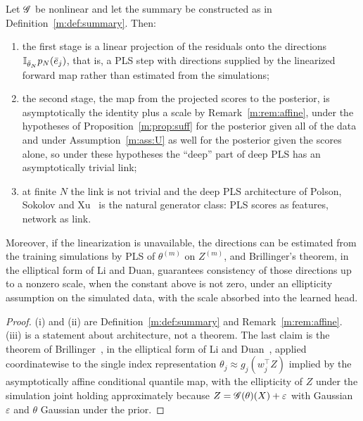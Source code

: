 \begin{proposition}\label{m:prop:dpls}
Let $\mathscr{G}$ be nonlinear and let the summary be constructed as in Definition~\ref{m:def:summary}. Then:
\begin{enumerate}[label=(\roman*),nosep]
\item the first stage is a linear projection of the residuals onto the directions $\mathbb{I}_{\bar\theta_N}p_N(\bar e_j)$, that is, a PLS step with directions supplied by the linearized forward map rather than estimated from the simulations;
\item the second stage, the map from the projected scores to the posterior, is asymptotically the identity plus a scale by Remark~\ref{m:rem:affine}, under the hypotheses of Proposition~\ref{m:prop:suff} for the posterior given all of the data and under Assumption~\ref{m:ass:U} as well for the posterior given the scores alone, so under these hypotheses the ``deep'' part of deep PLS has an asymptotically trivial link;
\item at finite $N$ the link is not trivial and the deep PLS architecture of Polson, Sokolov and Xu~\cite{polsonsokolovxu2021} is the natural generator class: PLS scores as features, network as link.
\end{enumerate}
Moreover, if the linearization is unavailable, the directions can be estimated from the training simulations by PLS of $\theta^{(m)}$ on $Z^{(m)}$, and Brillinger's theorem, in the elliptical form of Li and Duan, guarantees consistency of those directions up to a nonzero scale, when the constant above is not zero, under an ellipticity assumption on the simulated data, with the scale absorbed into the learned head.
\end{proposition}

\begin{proof}
(i) and (ii) are Definition~\ref{m:def:summary} and Remark~\ref{m:rem:affine}. (iii) is a statement about architecture, not a theorem. The last claim is the theorem of Brillinger~\cite{brillinger2012}, in the elliptical form of Li and Duan~\cite{liduan1989}, applied coordinatewise to the single index representation $\theta_j\approx g_j(w_j^\top Z)$ implied by the asymptotically affine conditional quantile map, with the ellipticity of $Z$ under the simulation joint holding approximately because $Z=\mathscr{G}(\theta)(X)+\varepsilon$ with Gaussian $\varepsilon$ and $\theta$ Gaussian under the prior.
\end{proof}
